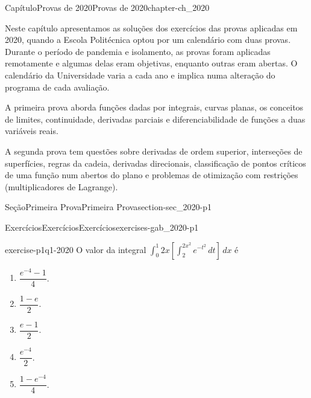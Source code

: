 \documentclass[oneside,10pt,]{book}
\numberwithin{equation}{section}
\begin{document}
\begin{chapterptx}{Capítulo}{Provas de 2020}{}{Provas de 2020}{}{}{chapter-ch_2020}
\renewcommand*{\chaptername}{Capítulo}
\begin{introduction}{}%
Neste capítulo apresentamos as soluções dos exercícios das provas aplicadas em 2020, quando a Escola Politécnica optou por um calendário com duas provas. Durante o período de pandemia e isolamento, as provas foram aplicadas remotamente e algumas delas eram objetivas, enquanto outras eram abertas. O calendário da Universidade varia a cada ano e implica numa alteração do programa de cada avaliação.%
\par
A primeira prova aborda funções dadas por integrais, curvas planas, os conceitos de limites, continuidade, derivadas parciais e diferenciabilidade de funções a duas variáveis reais.%
\par
A segunda prova tem questões sobre derivadas de ordem superior, interseções de superfícies, regras da cadeia, derivadas direcionais, classificação de pontos críticos de uma função num abertos do plano e problemas de otimização com restrições (multiplicadores de Lagrange).%
\end{introduction}%
%
%
\typeout{************************************************}
\typeout{************************************************}
%
\begin{sectionptx}{Seção}{Primeira Prova}{}{Primeira Prova}{}{}{section-sec_2020-p1}
%
%
\typeout{************************************************}
\typeout{************************************************}
%
\begin{exercises-subsection-numberless}{Exercícios}{Exercícios}{}{Exercícios}{}{}{exercises-gab_2020-p1}
\begin{divisionexercise}{1}{}{}{exercise-p1q1-2020}%
O valor da integral \(\displaystyle{\int_0^1 2x\left[\int_2^{2x^2}
e^{-t^2}\,dt\right]\, dx}\) é%
\begin{multicols}{3}
\begin{enumerate}[label=\alph*]
\item{}\(\dfrac{e^{-4}-1}{4}\).%
\item{}\(\dfrac{1-e}{2}\).%
\item{}\(\dfrac{e-1}{2}\).%
\item{}\(\dfrac{e^{-4}}{2}\).%
\item{}\(\dfrac{1-e^{-4}}{4}\).%
\end{enumerate}
\end{multicols}

\end{divisionexercise}
\end{exercises-subsection-numberless}
\end{sectionptx}
\end{chapterptx}
\end{document}
